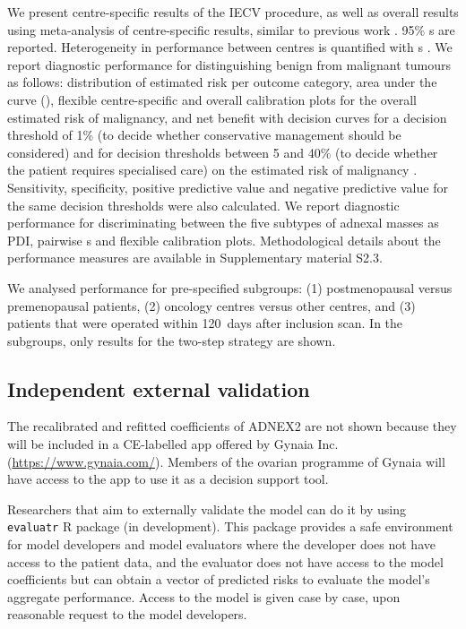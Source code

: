 We present centre-specific results of the IECV procedure, as well as overall results using meta-analysis of centre-specific results, similar to previous work \cite{erikssonUltrasoundbasedRiskModel2020,vancalsterEvaluatingRiskOvarian2014}. 95\% s are reported. Heterogeneity in performance between centres is quantified with s \cite{partlettRandomEffectsMetaanalysis2017}. We report diagnostic performance for distinguishing benign from malignant tumours as follows: distribution of estimated risk per outcome category, area under the  curve (), flexible centre-specific and overall calibration plots for the overall estimated risk of malignancy, and net benefit with decision curves for a decision threshold of 1\% (to decide whether conservative management should be considered) and for decision thresholds between 5 and 40\% (to decide whether the patient requires specialised care) on the estimated risk of malignancy \cite{barrenadaClusteredFlexibleCalibration2026,debrayFrameworkMetaanalysisPrediction2019,vancalsterPerformanceEvaluationPredictive2024,wynantsRandomeffectsMetaanalysisClinical2018}. Sensitivity, specificity, positive predictive value and negative predictive value for the same decision thresholds were also calculated. We report diagnostic performance for discriminating between the five subtypes of adnexal masses as \gls{PDI}, pairwise s and flexible calibration plots. Methodological details about the performance measures are available in Supplementary material S2.3.

We analysed performance for pre-specified subgroups: (1) postmenopausal versus premenopausal patients, (2) oncology centres versus other centres, and (3) patients that were operated within 120~days after inclusion scan. In the subgroups, only results for the two-step strategy are shown.

\subsection{Independent external validation}

The recalibrated and refitted coefficients of ADNEX2 are not shown because they will be included in a CE-labelled app offered by Gynaia Inc. (\url{https://www.gynaia.com/}). Members of the ovarian programme of Gynaia will have access to the app to use it as a decision support tool.

Researchers that aim to externally validate the model can do it by using \texttt{evaluatr} R package (in development). This package provides a safe environment for model developers and model evaluators where the developer does not have access to the patient data, and the evaluator does not have access to the model coefficients but can obtain a vector of predicted risks to evaluate the model's aggregate performance. Access to the model is given case by case, upon reasonable request to the model developers.

